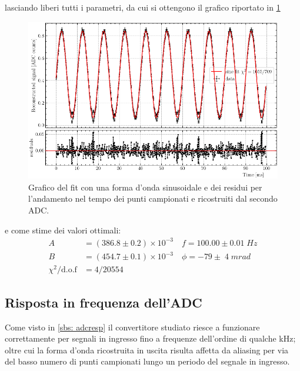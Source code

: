 \documentclass[10pt, a4paper, italian]{article}
\begin{document}
lasciando liberi tutti i parametri, da cui si ottengono il grafico riportato 
in \cref{fig: sinfit}
\begin{figure}[htbp]
    \centering
	\includegraphics[width=\textwidth]{sinfit}
    \caption{Grafico del fit con una forma d'onda sinusoidale e dei residui
    per l'andamento nel tempo dei punti campionati e ricostruiti dal secondo ADC.
    \label{fig: sinfit}}
\end{figure}
e come stime dei valori ottimali:
\begin{align*}
A &= (386.8 \pm 0.2) \times 10^{-3} \quad f = 100.00 \pm 0.01 \; \si{Hz} \\
B &= (454.7 \pm 0.1) \times 10^{-3} \quad \phi = -79 \pm \; 4 \; \si{mrad} \\
\chi^2/\text{d.o.f} &=  4 / 20554
\end{align*}

\subsection{Risposta in frequenza dell'ADC}
\label{sbs: freq}
Come visto in \cref{sbs: adcresp} il convertitore studiato riesce a funzionare
correttamente per segnali in ingresso fino a frequenze dell'ordine di qualche
kHz; oltre cui la forma d'onda ricostruita in uscita risulta affetta da
aliasing per via del basso numero di punti campionati lungo un periodo del
segnale in ingresso.
\end{document}
